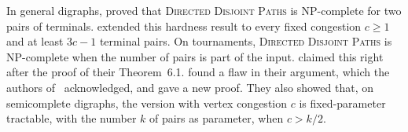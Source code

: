 \documentclass[fontsize=12pt,leading=14pt]{fullpaper}
\begin{document}
In general digraphs, \textcite{FHW80} proved that \textsc{Directed Disjoint Paths} is NP-complete for two pairs of terminals.
\textcite{BCHKKSch26} extended this hardness result to every fixed congestion $c\ge1$ and at least $3c-1$ terminal pairs.
On tournaments, \textsc{Directed Disjoint Paths} is NP-complete when the number of pairs is part of the input.
\textcite{BangJensenT92} claimed this right after the proof of their Theorem~6.1.
\textcite{GLS25} found a flaw in their argument, which the authors of~\cite{BangJensenT92} acknowledged, and gave a new proof.
They also showed that, on semicomplete digraphs, the version with vertex congestion $c$ is fixed-parameter tractable, with the number $k$ of pairs as parameter, when $c>k/2$.
\printbibliography
\end{document}
